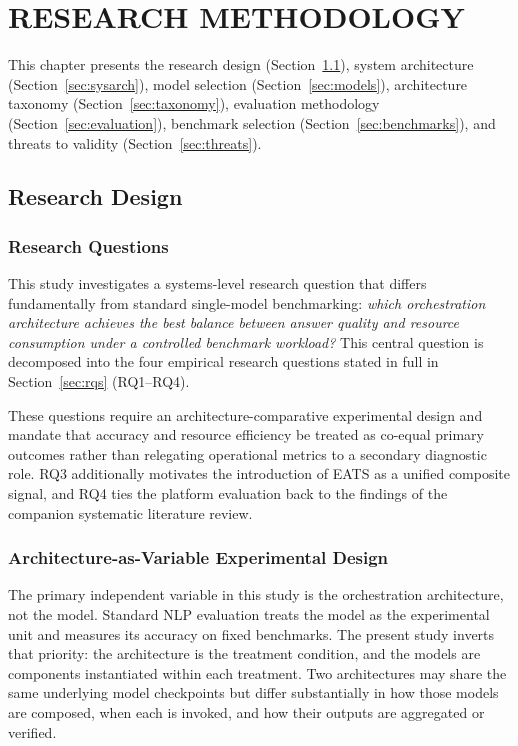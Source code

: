 \chapter{RESEARCH METHODOLOGY}

This chapter presents the research design (Section~\ref{sec:design}), system architecture (Section~\ref{sec:sysarch}), model selection (Section~\ref{sec:models}), architecture taxonomy (Section~\ref{sec:taxonomy}), evaluation methodology (Section~\ref{sec:evaluation}), benchmark selection (Section~\ref{sec:benchmarks}), and threats to validity (Section~\ref{sec:threats}).

\section{Research Design}
\label{sec:design}

\subsection{Research Questions}

This study investigates a systems-level research question that differs fundamentally from standard single-model benchmarking: \textit{which orchestration architecture achieves the best balance between answer quality and resource consumption under a controlled benchmark workload?} This central question is decomposed into the four empirical research questions stated in full in Section~\ref{sec:rqs} (RQ1--RQ4).

These questions require an architecture-comparative experimental design and mandate that accuracy and resource efficiency be treated as co-equal primary outcomes rather than relegating operational metrics to a secondary diagnostic role. RQ3 additionally motivates the introduction of EATS as a unified composite signal, and RQ4 ties the platform evaluation back to the findings of the companion systematic literature review.

\subsection{Architecture-as-Variable Experimental Design}

The primary independent variable in this study is the orchestration architecture, not the model. Standard NLP evaluation treats the model as the experimental unit and measures its accuracy on fixed benchmarks. The present study inverts that priority: the architecture is the treatment condition, and the models are components instantiated within each treatment. Two architectures may share the same underlying model checkpoints but differ substantially in how those models are composed, when each is invoked, and how their outputs are aggregated or verified.

